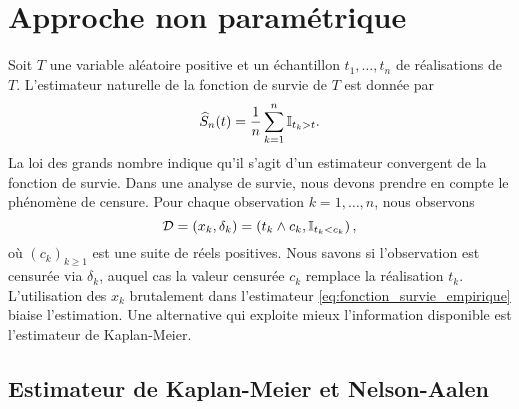 \chapter{Approche non paramétrique}\label{chap:nonparametric}
Soit $T$ une variable aléatoire positive et un échantillon $t_1,\ldots, t_n$ de réalisations \iid de $T$. L'estimateur naturelle de la fonction de survie de $T$ est donnée par 
\begin{equation}\label{eq:fonction_survie_empirique}
\widehat{S}_n(t) =\frac{1}{n}\sum_{k=1}^n\mathbb{I}_{t_k >t}.
\end{equation}
La loi des grands nombre indique qu'il s'agit d'un estimateur convergent de la fonction de survie. Dans une analyse de survie, nous devons prendre en compte le phénomène de censure. Pour chaque observation $k=1,\ldots, n$, nous observons 
$$
\mathcal{D} = (x_k, \delta_k) = \left(t_k\land c_k, \mathbb{I}_{t_k<c_k}\right),
$$
où $(c_k)_{k\geq1}$ est une suite de réels positives. Nous savons si l'observation est censurée via $\delta_k$, auquel cas la valeur censurée $c_k$ remplace la réalisation $t_k$. L'utilisation des $x_k$ brutalement dans l'estimateur \eqref{eq:fonction_survie_empirique} biaise l'estimation. Une alternative qui exploite mieux l'information disponible est l'estimateur de Kaplan-Meier.
\section{Estimateur de Kaplan-Meier et Nelson-Aalen}

